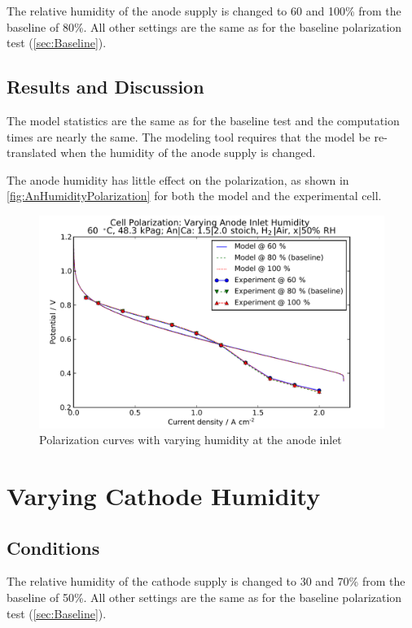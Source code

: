 The relative humidity of the anode supply is changed to 60 and 100\% from the 
baseline of 80\%.  All other settings are the same as for the baseline polarization test (\autoref{sec:Baseline}).

\subsection{Results and Discussion}

The model statistics are the same as for the baseline test and the computation times are nearly the same.  The modeling tool requires that the model be re-translated when the humidity of the anode supply is changed.  

The anode humidity has little effect on the polarization, as shown in \autoref{fig:AnHumidityPolarization} for both the model and the experimental cell.

\begin{figure}[htbp]
  \includegraphics[width=\linewidth]{Results/Cell/Model/AnHumidity/Polarization}%
  \caption{Polarization curves with varying humidity at the anode inlet}%
  \label{fig:AnHumidityPolarization}
\end{figure}


\FloatBarrier %
\section{Varying Cathode Humidity}
\label{sec:CaHumidity}

\subsection{Conditions}

The relative humidity of the cathode supply is changed to 30 and 70\% from the 
baseline of 50\%.  All other settings are the same as for the baseline polarization test (\autoref{sec:Baseline}).


